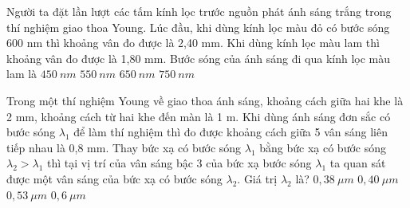 \begin{ex}%
Người ta đặt lần lượt các tấm kính lọc trước nguồn phát ánh sáng trắng trong thí nghiệm giao thoa Young. Lúc đầu, khi dùng kính lọc màu đỏ có bước sóng 600 nm thì khoảng vân đo được là 2,40 mm. Khi dùng kính lọc màu lam thì khoảng vân đo được là 1,80 mm. Bước sóng của ánh sáng đi qua kính lọc màu lam là
\choice
{\True $450\ nm$}
{$550\ nm$}
{$650\ nm$}
{$750\ nm$}
\end{ex} 
\begin{ex}%
Trong một thí nghiệm Young về giao thoa ánh sáng, khoảng cách giữa hai khe là 2 mm, khoảng cách từ hai khe đến màn là 1 m. Khi dùng ánh sáng đơn sắc có bước sóng $\lambda_1 $ để làm thí nghiệm thì đo được khoảng cách giữa 5 vân sáng liên tiếp nhau là 0,8 mm. Thay bức xạ có bước sóng $\lambda_1 $ bằng bức xạ có bước sóng $\lambda_2>\lambda_1 $ thì tại vị trí của vân sáng bậc 3 của bức xạ bước sóng $\lambda_1 $ ta quan sát được một vân sáng của bức xạ có bước sóng $\lambda_2 $. Giá trị $\lambda_2 $ là?
\choice
{ $0,38\ \mu m $}
{ $0,40\ \mu m $}
{ $0,53\ \mu m $}
{\True $0,6\ \mu m $}
\end{ex} 

